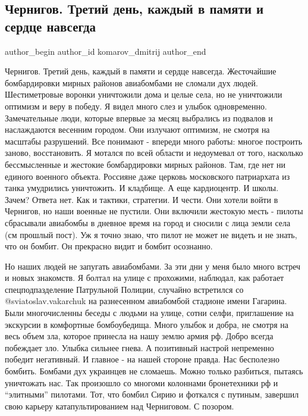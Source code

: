  
 
 
 
 
 
\subsection{Чернигов. Третий день, каждый в памяти и сердце навсегда}
\label{sec:07_04_2022.fb.komarov_dmitrij.1.chernigov}
 
\ifcmt
 author_begin
   author_id komarov_dmitrij
 author_end
\fi

Чернигов. Третий день, каждый в памяти и сердце навсегда. Жесточайшие
бомбардировки мирных районов авиабомбами не сломали дух людей. Шестиметровые
воронки уничтожили дома и целые села, но не уничтожили оптимизм и веру в
победу. Я видел много слез и улыбок одновременно. Замечательные люди, которые
впервые за месяц выбрались из подвалов и наслаждаются весенним городом. Они
излучают оптимизм, не смотря на масштабы разрушений. Все понимают - впереди
много работы: многое построить заново, восстановить. Я мотался по всей области
и недоумевал от того, насколько бессмысленные и жестокие бомбардировки мирных
районов. Там, где нет ни единого военного объекта. Россияне даже церковь
московского патриархата из танка умудрились уничтожить. И кладбище. А еще
кардиоцентр. И школы. Зачем? Ответа нет. Как и тактики, стратегии. И чести. Они
хотели войти в Чернигов, но наши военные не пустили. Они включили жестокую
месть - пилоты сбрасывали авиабомбы в дневное время на город и сносили с лица
земли села (см прошлый пост). Уж я точно знаю, что пилот не может не видеть и
не знать, что он бомбит. Он прекрасно видит и бомбит осознанно.


Но наших людей не запугать авиабомбами. За эти дни у меня было много встреч и
новых знакомств. Я болтал на улице с прохожими, наблюдал, как работает
спецподпазделение Патрульной Полиции,  случайно встретился со
@sviatoslav.vakarchuk на разнесенном авиабомбой стадионе имени Гагарина. Были
многочисленны беседы с людьми на улице, сотни селфи, приглашение на экскурсии в
комфортные бомбоубедища. Много улыбок и добра, не смотря на весь объем зла,
которое принесла на нашу землю армия рф. Добро всегда побеждает зло. Улыбка
сильнее гнева. А позитивный настрой непременно победит негативный. И главное -
на нашей стороне правда. Нас бесполезно бомбить. Бомбами дух украинцев не
сломаешь. Можно только разбиться, пытаясь уничтожать нас. Так произошло со
многоми колоннами бронетехники рф и \enquote{элитными} пилотами. Тот, что бомбил Сирию
и фоткался с путиным, завершил свою карьеру катапультированием над Черниговом.
С позором.

